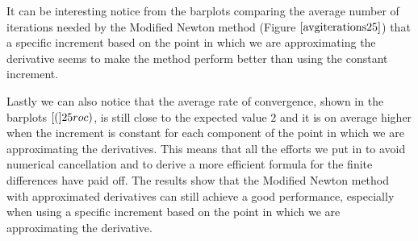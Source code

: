 It can be interesting notice from the barplots comparing the average number of iterations needed by the Modified Newton method (Figure $\eqref{avgiterations25}$) that a specific increment based on the point in which we are approximating the derivative seems to make the method perform better than using the constant increment.  

Lastly we can also notice that the average rate of convergence, shown in the barplots $\eqref(25roc)$, is still close to the expected value $2$ and it is on average higher when the increment is constant for each component of the point in which we are approximating the derivatives.
This means that all the efforts we put in to avoid numerical cancellation and to derive a more efficient formula for the finite differences have paid off. The results show that the Modified Newton method with approximated derivatives can still achieve a good performance, especially when using a specific increment based on the point in which we are approximating the derivative. 